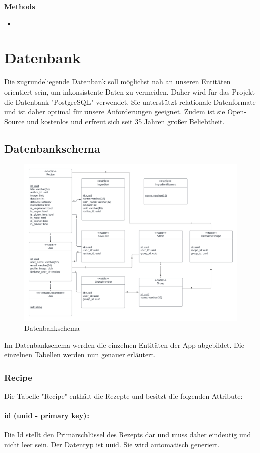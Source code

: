 \documentclass[parskip=full]{scrartcl}
\begin{document}
        \textbf{Methods}
        \begin{itemize}
            \item 
        \end{itemize}
 
\newpage

\section{Datenbank}
Die zugrundeliegende Datenbank soll möglichst nah an unseren Entitäten orientiert sein, um inkonsistente Daten zu vermeiden. Daher wird für das Projekt die Datenbank "PostgreSQL" verwendet. Sie unterstützt relationale Datenformate und ist daher optimal für unsere Anforderungen geeignet. Zudem ist sie Open-Source und kostenlos und erfreut sich seit 35 Jahren großer Beliebtheit.
\subsection{Datenbankschema}
\begin{figure}[htp]
    \centering
    \includegraphics[width = \linewidth]{images/Database/schema.png}
    \caption{Datenbankschema}
\end{figure}
Im Datenbankschema werden die einzelnen Entitäten der App abgebildet. Die einzelnen Tabellen werden nun genauer erläutert.
\newpage
\subsubsection{Recipe}
Die Tabelle "Recipe" enthält die Rezepte und besitzt die folgenden Attribute:
\paragraph{id (uuid - primary key):} Die Id stellt den Primärschlüssel des Rezepts dar und muss daher eindeutig und nicht leer sein. Der Datentyp ist \Gls{uuid}. Sie wird automatisch generiert.
\end{document}
